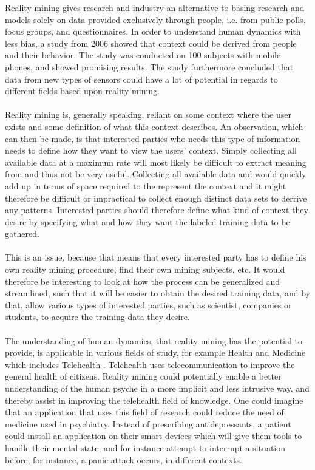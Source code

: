Reality mining gives research and industry an alternative to basing research and models solely on data provided exclusively through people, i.e. from public polls, focus groups, and questionnaires. In order to understand human dynamics with less bias, a study from 2006 \parencite{eagle2006_reality_mining_definition} showed that context could be derived from people and their behavior. The study was conducted on 100 subjects with mobile phones, and showed promising results. The study furthermore concluded that data from new types of sensors could have a lot of potential in regards to different fields based upon reality mining. 
\\\\
Reality mining is, generally speaking, reliant on some context where the user exists and some definition of what this context describes. An observation, which can then be made, is that interested parties who needs this type of information needs to define how they want to view the users' context. Simply collecting all available data at a maximum rate will most likely be difficult to extract meaning from and thus not be very useful. Collecting all available data and would quickly add up in terms of space required to the represent the context and it might therefore be difficult or impractical to collect enough distinct data sets to derrive any patterns. Interested parties should therefore define what kind of context they desire by specifying what and how they want the labeled training data to be gathered. 
\\\\
This is an issue, because that means that every interested party has to define his own reality mining procedure, find their own mining subjects, etc. It would therefore be interesting to look at how the process can be generalized and streamlined, such that it will be easier to obtain the desired training data, and by that, allow various types of interested parties, such as scientist, companies or students, to acquire the training data they desire.
\\\\
The understanding of human dynamics, that reality mining has the potential to provide, is applicable in various fields of study, for example Health and Medicine \parencite{pentland2009_reality_mining_health_medicine} which includes Telehealth \parencite{telehealth_aau}. Telehealth uses telecommunication to improve the general health of citizens. Reality mining could potentially enable a better understanding of the human psyche in a more implicit and less intrusive way, and thereby assist in improving the telehealth field of knowledge. One could imagine that an application that uses this field of research could reduce the need of medicine used in psychiatry. Instead of prescribing antidepressants, a patient could install an application on their smart devices which will give them tools to handle their mental state, and for instance attempt to interrupt a situation before, for instance, a panic attack occurs, in different contexts. 
